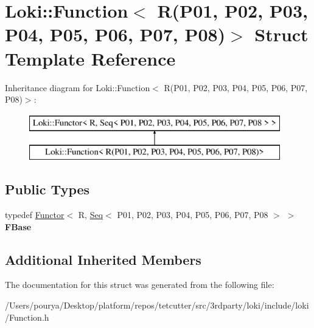 \hypertarget{structLoki_1_1Function_3_01R_07P01_00_01P02_00_01P03_00_01P04_00_01P05_00_01P06_00_01P07_00_01P08_08_4}{}\section{Loki\+:\+:Function$<$ R(P01, P02, P03, P04, P05, P06, P07, P08)$>$ Struct Template Reference}
\label{structLoki_1_1Function_3_01R_07P01_00_01P02_00_01P03_00_01P04_00_01P05_00_01P06_00_01P07_00_01P08_08_4}
Inheritance diagram for Loki\+:\+:Function$<$ R(P01, P02, P03, P04, P05, P06, P07, P08)$>$\+:\begin{figure}[H]
\begin{center}
\leavevmode
\includegraphics[height=2.000000cm]{structLoki_1_1Function_3_01R_07P01_00_01P02_00_01P03_00_01P04_00_01P05_00_01P06_00_01P07_00_01P08_08_4}
\end{center}
\end{figure}
\subsection*{Public Types}
\begin{DoxyCompactItemize}
\item 
\hypertarget{structLoki_1_1Function_3_01R_07P01_00_01P02_00_01P03_00_01P04_00_01P05_00_01P06_00_01P07_00_01P08_08_4_a347154673a07406f556b69432aa5d434}{}typedef \hyperlink{classLoki_1_1Functor}{Functor}$<$ R, \hyperlink{structLoki_1_1Seq}{Seq}$<$ P01, P02, P03, P04, P05, P06, P07, P08 $>$ $>$ {\bfseries F\+Base}\label{structLoki_1_1Function_3_01R_07P01_00_01P02_00_01P03_00_01P04_00_01P05_00_01P06_00_01P07_00_01P08_08_4_a347154673a07406f556b69432aa5d434}

\end{DoxyCompactItemize}
\subsection*{Additional Inherited Members}


The documentation for this struct was generated from the following file\+:\begin{DoxyCompactItemize}
\item 
/\+Users/pourya/\+Desktop/platform/repos/tetcutter/src/3rdparty/loki/include/loki/Function.\+h\end{DoxyCompactItemize}
